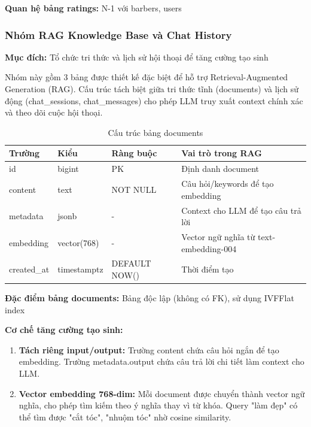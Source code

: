 \noindent\textbf{Quan hệ bảng ratings:} N-1 với barbers, users

\vspace{0.5cm}

\subsubsection{Nhóm RAG Knowledge Base và Chat History}

\textbf{Mục đích:} Tổ chức tri thức và lịch sử hội thoại để tăng cường tạo sinh

Nhóm này gồm 3 bảng được thiết kế đặc biệt để hỗ trợ 
Retrieval-Augmented Generation (RAG). Cấu trúc tách biệt giữa 
tri thức tĩnh (documents) và lịch sử động (chat\_sessions, chat\_messages) 
cho phép LLM truy xuất context chính xác và theo dõi cuộc hội thoại.

\begin{table}[H]
\centering
\caption{Cấu trúc bảng documents}
\begin{tabular}{|l|l|l|p{4cm}|}
\hline
\textbf{Trường} & \textbf{Kiểu} & \textbf{Ràng buộc} & \textbf{Vai trò trong RAG} \\
\hline
id & bigint & PK & Định danh document \\
\hline
content & text & NOT NULL & Câu hỏi/keywords để tạo embedding \\
\hline
metadata & jsonb & - & Context cho LLM để tạo câu trả lời \\
\hline
embedding & vector(768) & - & Vector ngữ nghĩa từ text-embedding-004 \\
\hline
created\_at & timestamptz & DEFAULT NOW() & Thời điểm tạo \\
\hline
\end{tabular}
\end{table}

\noindent\textbf{Đặc điểm bảng documents:} Bảng độc lập (không có FK), sử dụng IVFFlat index

\textbf{Cơ chế tăng cường tạo sinh:}
\begin{enumerate}
    \item \textbf{Tách riêng input/output:} Trường content chứa câu hỏi ngắn 
    để tạo embedding. Trường metadata.output chứa câu trả lời 
    chi tiết làm context cho LLM.
    
    \item \textbf{Vector embedding 768-dim:} Mỗi document được chuyển thành vector ngữ nghĩa, 
    cho phép tìm kiếm theo ý nghĩa thay vì từ khóa. Query "làm đẹp" có thể tìm được 
    "cắt tóc", "nhuộm tóc" nhờ cosine similarity.
\end{enumerate}

